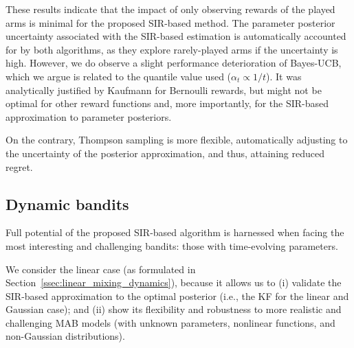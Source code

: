 \documentclass{article}
\newcommand{\ie}{i.e., }
\begin{document}
These results indicate that the impact of only observing rewards of the played arms is minimal for the proposed SIR-based method. The parameter posterior uncertainty associated with the SIR-based estimation is automatically accounted for by both algorithms, as they explore rarely-played arms if the uncertainty is high. However, we do observe a slight performance deterioration of Bayes-UCB, which we argue is related to the quantile value used ($\alpha_t\propto1/t$). It was analytically justified by Kaufmann \cite{ip-Kaufmann2012} for Bernoulli rewards, but might not be optimal for other reward functions and, more importantly, for the SIR-based approximation to parameter posteriors.

On the contrary, Thompson sampling is more flexible, automatically adjusting to the uncertainty of the posterior approximation, and thus, attaining reduced regret.

\subsection{Dynamic bandits}
\label{ssec:dynamic_bandits}

Full potential of the proposed SIR-based algorithm is harnessed when facing the most interesting and challenging bandits: those with time-evolving parameters.

We consider the linear case (as formulated in Section~\ref{ssec:linear_mixing_dynamics}), because it allows us to (i) validate the SIR-based approximation to the optimal posterior (\ie the KF for the linear and Gaussian case); and (ii) show its flexibility and robustness to more realistic and challenging MAB models (with unknown parameters, nonlinear functions, and non-Gaussian distributions). 
\end{document}
